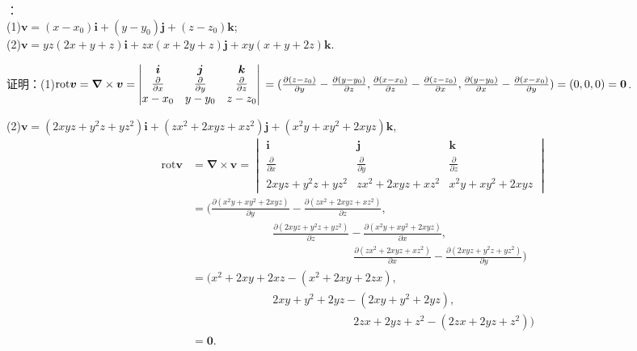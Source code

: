 \documentclass[12pt,UTF8,fleqn]{ctexart}
\newcommand{\ppx}[1]{\frac{\partial #1}{\partial x}}
\newcommand{\ppy}[1]{\frac{\partial #1}{\partial y}}
\newcommand{\ppz}[1]{\frac{\partial #1}{\partial z}}
\begin{document}
\begin{enumerate}
：\\
(1)$\bm v=(x-x_0)\bm i+(y-y_0)\bm j+(z-z_0)\bm k$;\\
(2)$\bm v=yz(2x+y+z)\bm i+zx(x+2y+z)\bm j+xy(x+y+2z)\bm k$.

证明：(1)$\text{rot}\bm v=\bm\nabla\times\bm v=\begin{vmatrix}
\bm i&\bm j&\bm k\\
\ppx{}&\ppy{}&\ppz{}\\
x-x_0&y-y_0&z-z_0
\end{vmatrix}\\
=(\ppy{(z-z_0)}-\ppz{(y-y_0)},\ppz{(x-x_0)}-\ppx{(z-z_0)},\ppx{(y-y_0)}-\ppy{(x-x_0)})=(0,0,0)=\bm0$.

(2)$\bm v=(2xyz+y^2z+yz^2)\bm i+(zx^2+2xyz+xz^2)\bm j+(x^2y+xy^2+2xyz)\bm k$,
\[\begin{aligned}
\text{rot}\bm v&=\bm\nabla\times\bm v=\begin{vmatrix}
\bm i&\bm j&\bm k\\
\ppx{}&\ppy{}&\ppz{}\\
2xyz+y^2z+yz^2&zx^2+2xyz+xz^2&x^2y+xy^2+2xyz
\end{vmatrix}\\
&=(\ppy{(x^2y+xy^2+2xyz)}-\ppz{(zx^2+2xyz+xz^2)},\\
&\hspace{3cm}\ppz{(2xyz+y^2z+yz^2)}-\ppx{(x^2y+xy^2+2xyz)},\\
&\hspace{6cm}\ppx{(zx^2+2xyz+xz^2)}-\ppy{(2xyz+y^2z+yz^2)})\\
&=(x^2+2xy+2xz-(x^2+2xy+2zx),\\
&\hspace{3cm}2xy+y^2+2yz-(2xy+y^2+2yz),\\
&\hspace{6cm}2zx+2yz+z^2-(2zx+2yz+z^2))\\
&=\bm0.
\end{aligned}\]
\end{enumerate}
\end{document}

